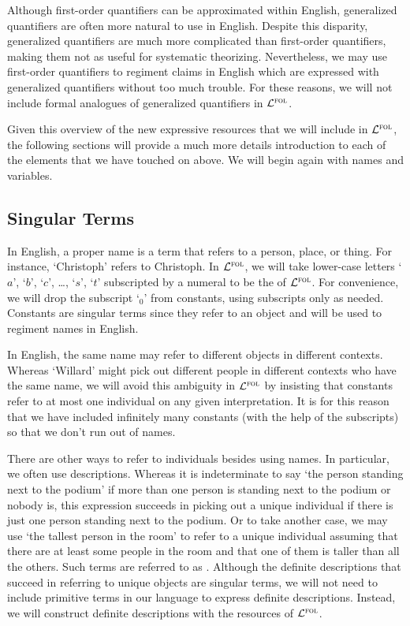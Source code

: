 Although first-order quantifiers can be approximated within English, generalized quantifiers are often more natural to use in English.
Despite this disparity, generalized quantifiers are much more complicated than first-order quantifiers, making them not as useful for systematic theorizing.
Nevertheless, we may use first-order quantifiers to regiment claims in English which are expressed with generalized quantifiers without too much trouble. 
For these reasons, we will not include formal analogues of generalized quantifiers in $\mathcal{L}^{\textsc{fol}}$.

Given this overview of the new expressive resources that we will include in $\mathcal{L}^{\textsc{fol}}$, the following sections will provide a much more details introduction to each of the elements that we have touched on above.
We will begin again with names and variables.




\subsection{Singular Terms}

In English, a proper name is a term that refers to a person, place, or thing.
For instance, `Christoph' refers to Christoph.
In $\mathcal{L}^{\textsc{fol}}$, we will take lower-case letters `$a$', `$b$', `$c$', \ldots, `$s$', `$t$' subscripted by a numeral to be the  of $\mathcal{L}^{\textsc{fol}}$.
For convenience, we will drop the subscript `$_0$' from constants, using subscripts only as needed. 
Constants are singular terms since they refer to an object and will be used to regiment names in English. 

In English, the same name may refer to different objects in different contexts.
Whereas `Willard' might pick out different people in different contexts who have the same name, we will avoid this ambiguity in $\mathcal{L}^{\textsc{fol}}$ by insisting that constants refer to at most one individual on any given interpretation.
It is for this reason that we have included infinitely many constants (with the help of the subscripts) so that we don't run out of names.

There are other ways to refer to individuals besides using names.
In particular, we often use descriptions.
Whereas it is indeterminate to say `the person standing next to the podium' if more than one person is standing next to the podium or nobody is, this expression succeeds in picking out a unique individual if there is just one person standing next to the podium.
Or to take another case, we may use `the tallest person in the room' to refer to a unique individual assuming that there are at least some people in the room and that one of them is taller than all the others.
Such terms are referred to as .
Although the definite descriptions that succeed in referring to unique objects are singular terms, we will not need to include primitive terms in our language to express definite descriptions.
Instead, we will construct definite descriptions with the resources of $\mathcal{L}^{\textsc{fol}}$.

